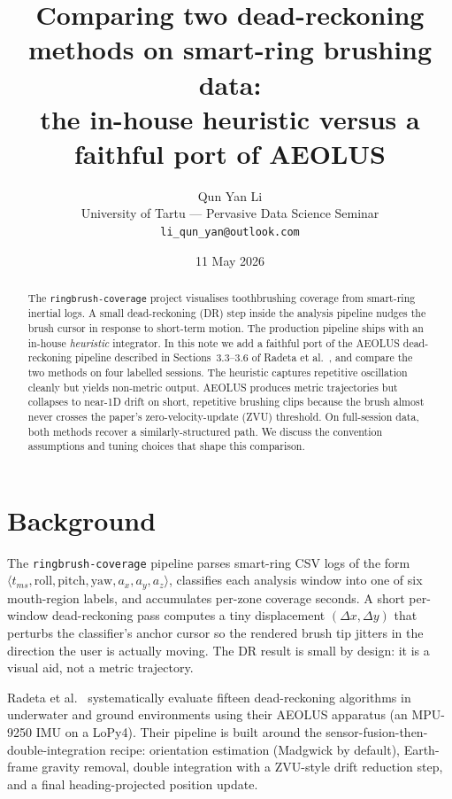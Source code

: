 \documentclass[a4paper,11pt]{article}
\title{%
    Comparing two dead-reckoning methods on smart-ring brushing data:\\
    the in-house heuristic versus a faithful port of AEOLUS \cite{radeta2023}%
}
\author{%
    Qun Yan Li\\
    \small University of Tartu --- Pervasive Data Science Seminar\\
    \small \texttt{li\_qun\_yan@outlook.com}%
}
\date{11 May 2026}
\begin{document}
\maketitle

\begin{abstract}
The \texttt{ringbrush-coverage} project visualises toothbrushing coverage from
smart-ring inertial logs. A small dead-reckoning (DR) step inside the analysis
pipeline nudges the brush cursor in response to short-term motion. The
production pipeline ships with an in-house \emph{heuristic} integrator. In this
note we add a faithful port of the AEOLUS dead-reckoning pipeline described in
Sections~3.3--3.6 of Radeta et al.\ \cite{radeta2023}, and compare the two
methods on four labelled sessions. The heuristic captures repetitive
oscillation cleanly but yields non-metric output. AEOLUS produces metric
trajectories but collapses to near-1D drift on short, repetitive brushing
clips because the brush almost never crosses the paper's
zero-velocity-update (ZVU) threshold. On full-session data, both methods
recover a similarly-structured path. We discuss the convention assumptions
and tuning choices that shape this comparison.
\end{abstract}

\section{Background}

The \texttt{ringbrush-coverage} pipeline parses smart-ring CSV logs of the form
$\langle t_{ms}, \mathrm{roll}, \mathrm{pitch}, \mathrm{yaw}, a_x, a_y, a_z
\rangle$, classifies each analysis window into one of six mouth-region labels,
and accumulates per-zone coverage seconds. A short per-window dead-reckoning
pass computes a tiny displacement $(\Delta x, \Delta y)$ that perturbs the
classifier's anchor cursor so the rendered brush tip jitters in the direction
the user is actually moving. The DR result is small by design: it is a visual
aid, not a metric trajectory.

Radeta et al.\ \cite{radeta2023} systematically evaluate fifteen dead-reckoning
algorithms in underwater and ground environments using their AEOLUS apparatus
(an MPU-9250 IMU on a LoPy4). Their pipeline is built around the
sensor-fusion-then-double-integration recipe: orientation estimation
(Madgwick by default), Earth-frame gravity removal, double integration with a
ZVU-style drift reduction step, and a final heading-projected position
update.
\end{document}
